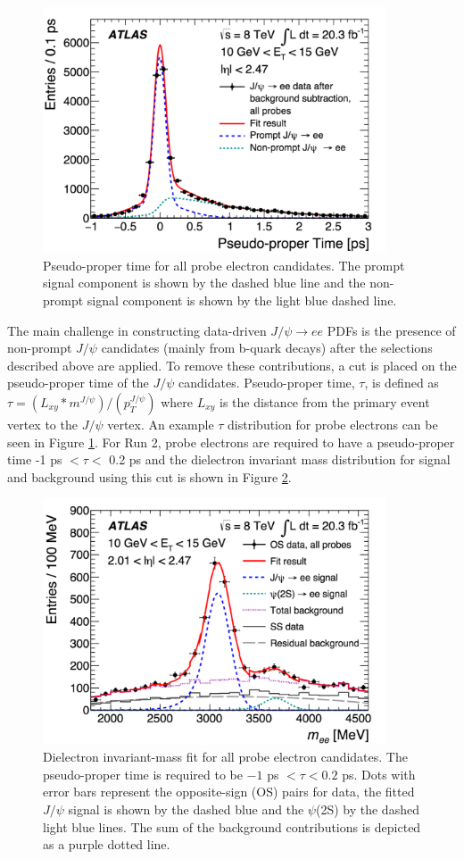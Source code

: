 \begin{figure}[hbt!]
    \centering
    \includegraphics[width=4in]{figures/chapter5/tau_probes.pdf}
    \caption{Pseudo-proper time for all probe electron candidates. The prompt signal component is shown by the dashed blue line and the non-prompt signal component is shown by the light blue dashed line.}
    \label{fig:tau_probes}
\end{figure}

The main challenge in constructing data-driven $J/\psi\rightarrow ee$ PDFs is the presence of non-prompt $J/\psi$ candidates (mainly from b-quark decays) after the selections described above are applied. To remove these contributions, a cut is placed on the pseudo-proper time of the $J/\psi$ candidates. Pseudo-proper time, $\tau$, is defined as $\tau=(L_{xy}*m^{J/\psi})/(p_T^{J/\psi})$ where $L_{xy}$ is the distance from the primary event vertex to the $J/\psi$ vertex. An example $\tau$ distribution for probe electrons can be seen in Figure \ref{fig:tau_probes}. For Run 2, probe electrons are required to have a pseudo-proper time -1 ps $<\tau<$ 0.2 ps and the dielectron invariant mass distribution for signal and background using this cut is shown in Figure \ref{fig:tau_cuts}.

\begin{figure}[hbt!]
    \centering
    \includegraphics[width=4in]{figures/chapter5/before_tau_cut.pdf}
    \caption{Dielectron invariant-mass fit for all probe electron candidates. The pseudo-proper time is required to be $-1$ ps $ < \tau < 0.2$ ps. Dots with error bars represent the opposite-sign (OS) pairs for data, the fitted $J/\psi$ signal is shown by the dashed blue and the $\psi$(2S) by the dashed light blue lines. The sum of the background contributions is depicted as a purple dotted line.}
    \label{fig:tau_cuts}
\end{figure}

